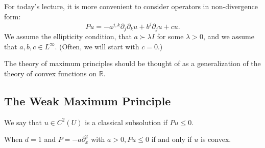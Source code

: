For today's lecture, it is more convenient to consider operators in non-divergence form:
$$
P u=-a^{j, k} \partial_{j} \partial_{k} u +b^{j} \partial_{j} u+c u .
$$
We assume the ellipticity condition, that $a \succ \lambda I$ for some $\lambda>0$, and we assume that $a, b, c \in L^{\infty}$. (Often, we will start with $c=0$.)

The theory of maximum principles should be thought of as a generalization of the theory of convex functions on $\mathbb{R}$. 

\subsection{The Weak Maximum Principle}

\begin{definition}
\label{def: (Classical) subsolution}
We say that $u\in C^2(U)$ is a classical subsolution if $Pu \le 0$. 
\end{definition}

\begin{remark}
When $d=1$ and $P=-a\partial_x^2$ with $a>0, Pu\le 0$ if and only if $u$ is convex. 
\end{remark}

